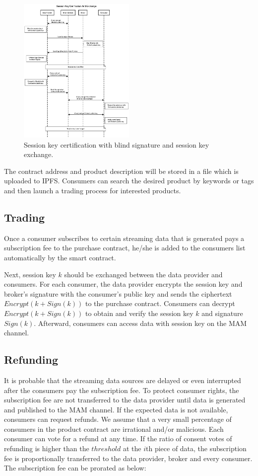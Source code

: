 \documentclass[journal,10pt,a4paper]{IEEEtran}
\begin{document}
\begin{figure}[h]
    \centering
    \includegraphics[width=0.5\textwidth]{key_certification_exchange}
    \caption{Session key certification with blind signature and session key exchange.}
    \label{fig:key_certification_exchange}
\end{figure}

The contract address and product description will be stored in a file which is uploaded to IPFS. Consumers can search the desired product by keywords or tags and then launch a trading process for interested products.

\subsection{Trading}
Once a consumer subscribes to certain streaming data that is generated pays a subscription fee to the purchase contract, he/she is added to the consumers list automatically by the smart contract.

Next, session key $k$ should be exchanged between the data provider and consumers. For each consumer, the data provider encrypts the session key and broker's signature with the consumer's public key and sends the ciphertext $Encrypt(k + Sign(k))$ to the purchase contract. Consumers can decrypt $Encrypt(k + Sign(k))$ to obtain and verify the session key $k$ and signature $Sign(k)$. Afterward, consumers can access data with session key on the MAM channel.

\subsection{Refunding}
It is probable that the streaming data sources are delayed or even interrupted after the consumers pay the subscription fee. To protect consumer rights, the subscription fee are not transferred to the data provider until data is generated and published to the MAM channel. If the expected data is not available, consumers can request refunds. We assume that a very small percentage of consumers in the product contract are irrational and/or malicious. Each consumer can vote for a refund at any time. If the ratio of consent votes of refunding is higher than the $threshold$ at the $i$th piece of data, the subscription fee is proportionally transferred to the data provider, broker and every consumer. The subscription fee can be prorated as below:
\end{document}
